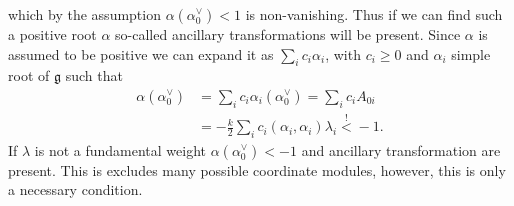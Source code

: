 which by the assumption $\alpha(\alpha_0^\vee)<1$ is non-vanishing. Thus if we can find such a positive root $\alpha$ so-called ancillary transformations will be present. Since $\alpha$ is assumed to be positive we can expand it as $\sum_i c_i\alpha_i$, with $c_i\geq 0$ and $\alpha_i$ simple root of $\mathfrak{g}$ such that
\begin{equation}
    \begin{aligned}
        \alpha(\alpha_0^\vee) &= \sum_i c_i\alpha_i(\alpha_0^\vee) = \sum_i c_i A_{0i}\\ 
        &= -\frac{k}{2}\sum_ic_i(\alpha_i,\alpha_i)\lambda_i\overset{!}{<}-1.
    \end{aligned}
\end{equation}
If $\lambda$ is not a fundamental weight $\alpha(\alpha_0^\vee)<-1$ and ancillary transformation are present. This is excludes many possible coordinate modules, however, this is only a necessary condition. 

